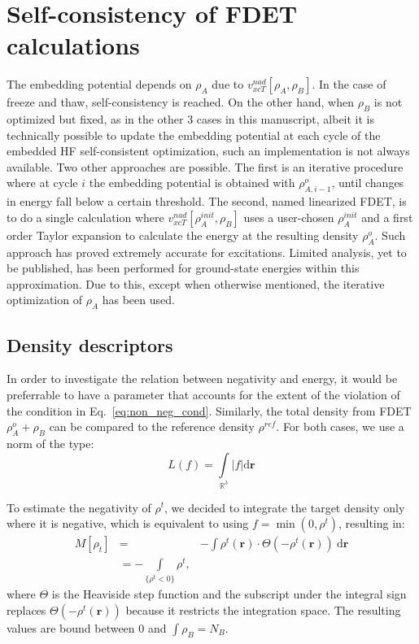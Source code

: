 \documentclass[journal=jctcce,manuscript=article, layout=twocolumn]{achemso}
\begin{document}
\section{Self-consistency of FDET calculations}\label{sect:self_consistency}
The embedding potential depends on $\rho_A$ due to $v_{xcT}^{nad}[\rho_A, \rho_B]$. In the case of freeze and thaw, self-consistency is reached. On the other hand, when $\rho_B$ is not optimized but fixed, as in the other 3 cases in this manuscript, albeit it is technically possible to update the embedding potential at each cycle of the embedded HF self-consistent optimization\cite{Dulak2009}, such an implementation is not always available. Two other approaches are possible.  The first is an iterative procedure where at cycle $i$ the embedding potential is obtained with $\rho^o_{A,i-1}$, until changes in energy fall below a certain threshold. The second, named linearized FDET, is to do a single calculation where $v_{xcT}^{nad}[\rho_A^{init}, \rho_B]$ uses a user-chosen $\rho_A^{init}$ and a first order Taylor expansion to calculate the energy at the resulting density $\rho^{o}_A$. Such approach has proved extremely accurate for excitations\cite{Zech2015}. Limited analysis, yet to be published, has been performed for ground-state energies within this approximation. Due to this, except when otherwise mentioned, the iterative optimization of $\rho_A$ has been used.

\subsection{Density descriptors}\label{sect:dens_descr}
In order to investigate the relation between negativity and energy, it would be preferrable to have a parameter that accounts for the extent of the violation of the condition in Eq.~\ref{eq:non_neg_cond}. Similarly, the total density from FDET $\rho^{o}_{A} + \rho_B$ can be compared to the reference density $\rho^{ref}$.
For both cases, we use a norm of the type:
\begin{equation}\label{eq:norm}
 L(f) = \int \limits_{\mathbb{R}^3} \vert f \vert \mathrm{d}\mathbf{r}
\end{equation}

To estimate the negativity of $\rho^t$, we decided to integrate the target density only where it is negative, which is equivalent to using $f=\min(0,\rho^t)$, resulting in:
\begin{align}\label{eq:M}
  M[\rho_{t}] & = & -\int \rho^{t}(\mathbf{r})\cdot \Theta(-\rho^{t}(\mathbf{r})) \ \mathrm{d}\mathbf{r} \\ \nonumber
  & = -\int \limits_{\{\rho^t < 0\}} \rho^{t},
  \end{align}
where $\Theta$ is the Heaviside step function and the subscript under the integral sign replaces $\Theta(-\rho^{t}(\mathbf{r}))$ because it restricts the integration space. The resulting values are bound between 0 and $\int \rho_B = N_B$.
\end{document}

